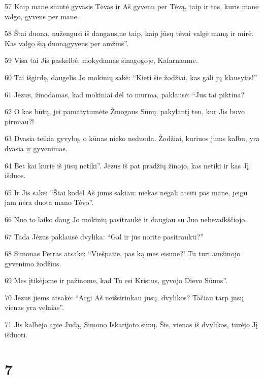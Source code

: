 \par 57 Kaip mane siuntė gyvasis Tėvas ir Aš gyvenu per Tėvą, taip ir tas, kuris mane valgo, gyvens per mane. 
\par 58 Štai duona, nužengusi iš dangaus,­ne taip, kaip jūsų tėvai valgė maną ir mirė. Kas valgo šią duoną­gyvens per amžius”. 
\par 59 Visa tai Jis paskelbė, mokydamas sinagogoje, Kafarnaume. 
\par 60 Tai išgirdę, daugelis Jo mokinių sakė: “Kieti šie žodžiai, kas gali jų klausytis!” 
\par 61 Jėzus, žinodamas, kad mokiniai dėl to murma, paklausė: “Jus tai piktina? 
\par 62 O kas būtų, jei pamatytumėte Žmogaus Sūnų, pakylantį ten, kur Jis buvo pirmiau?! 
\par 63 Dvasia teikia gyvybę, o kūnas nieko neduoda. Žodžiai, kuriuos jums kalbu, yra dvasia ir gyvenimas. 
\par 64 Bet kai kurie iš jūsų netiki”. Jėzus iš pat pradžių žinojo, kas netiki ir kas Jį išduos. 
\par 65 Ir Jis sakė: “Štai kodėl Aš jums sakiau: niekas negali ateiti pas mane, jeigu jam nėra duota mano Tėvo”. 
\par 66 Nuo to laiko daug Jo mokinių pasitraukė ir daugiau su Juo nebevaikščiojo. 
\par 67 Tada Jėzus paklausė dvylika: “Gal ir jūs norite pasitraukti?” 
\par 68 Simonas Petras atsakė: “Viešpatie, pas ką mes eisime?! Tu turi amžinojo gyvenimo žodžius. 
\par 69 Mes įtikėjome ir pažinome, kad Tu esi Kristus, gyvojo Dievo Sūnus”. 
\par 70 Jėzus jiems atsakė: “Argi Aš neišsirinkau jūsų, dvylikos? Tačiau tarp jūsų vienas yra velnias”. 
\par 71 Jis kalbėjo apie Judą, Simono Iskarijoto sūnų. Šis, vienas iš dvylikos, turėjo Jį išduoti.


\chapter{7}


